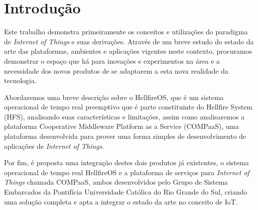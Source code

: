 \section{Introdução}
Este trabalho demonstra primeiramente os conceitos e utilizações do paradigma de
\textit{Internet of Things} e suas derivações. Através de um breve estudo do estado
da arte das plataformas, ambientes e aplicações vigentes neste contexto, procuramos
demonstrar o espaço que há para inovações e experimentos na área e a necessidade
dos novos produtos de se adaptarem a esta nova realidade da tecnologia.

Abordaremos uma breve descrição sobre o HellfireOS, que é um sistema operacional de
tempo real preemptivo que é parte constituinte do Hellfire System (HFS), analisando
suas características e limitações, assim como analisaremos a plataforma Cooperative
Middleware Platform as a Service (COMPaaS), uma plataforma desenvolvida para prover
uma forma simples de desenvolvimento de aplicações de \textit{Internet of Things}.

Por fim, é proposta uma integração destes dois produtos já existentes, o sistema
operacional de tempo real HellfireOS e a plataforma de serviços para \textit{Internet of Things}
chamada COMPaaS, ambos desenvolvidos pelo Grupo de Sistema Embarcados da Pontifícia Universidade
Católica do Rio Grande do Sul, criando uma solução completa e apta a integrar o estado da
arte no conceito de IoT.
